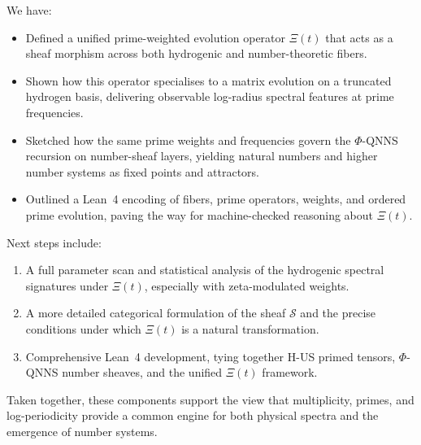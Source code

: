 \documentclass[11pt]{article}
\begin{document}
We have:
\begin{itemize}
  \item Defined a unified prime-weighted evolution operator $\Xi(t)$
  that acts as a sheaf morphism across both hydrogenic and
  number-theoretic fibers.

  \item Shown how this operator specialises to a matrix evolution on a
  truncated hydrogen basis, delivering observable log-radius spectral
  features at prime frequencies.

  \item Sketched how the same prime weights and frequencies govern the
  $\Phi$-QNNS recursion on number-sheaf layers, yielding natural numbers
  and higher number systems as fixed points and attractors.

  \item Outlined a Lean~4 encoding of fibers, prime operators, weights,
  and ordered prime evolution, paving the way for machine-checked
  reasoning about $\Xi(t)$.
\end{itemize}

Next steps include:
\begin{enumerate}
  \item A full parameter scan and statistical analysis of the hydrogenic
  spectral signatures under $\Xi(t)$, especially with zeta-modulated
  weights.

  \item A more detailed categorical formulation of the sheaf $\mathcal{S}$
  and the precise conditions under which $\Xi(t)$ is a natural
  transformation.

  \item Comprehensive Lean~4 development, tying together H-US primed
  tensors, $\Phi$-QNNS number sheaves, and the unified $\Xi(t)$
  framework.
\end{enumerate}

Taken together, these components support the view that multiplicity,
primes, and log-periodicity provide a common engine for both physical
spectra and the emergence of number systems.

\nocite{*}

 
\end{document}
